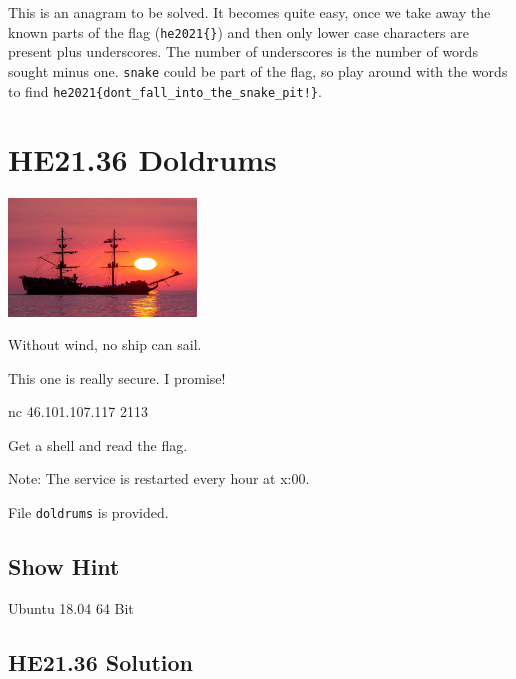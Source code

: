 \documentclass[english,a4paper,nols,noindent]{tufte-handout}
\begin{document}
\noindent This is an anagram to be solved.
It becomes quite easy, once we take away the known parts of the flag
(\verb+he2021{}+) and then only lower case characters are present plus
underscores.  The number of underscores is the number of words sought minus
one.  \verb+snake+ could be part of the flag, so play around with the words to find
\verb+he2021{dont_fall_into_the_snake_pit!}+.



\hypertarget{he21.36}{%
\section{HE21.36 Doldrums}
  \label{he21.36}}
\begin{marginfigure}
    \includegraphics[width=50mm]{images/challenge36.jpg}
\end{marginfigure}

\noindent Without wind, no ship can sail.

This one is really secure. I promise!

nc 46.101.107.117 2113

Get a shell and read the flag.

Note: The service is restarted every hour at x:00.

File \verb+doldrums+ is provided.

\subsection{Show Hint}
Ubuntu 18.04 64 Bit

\hypertarget{he21.36-solution}{%
\subsection{HE21.36 Solution}\label{he21.36-solution}}

\noindent 
\end{document}
